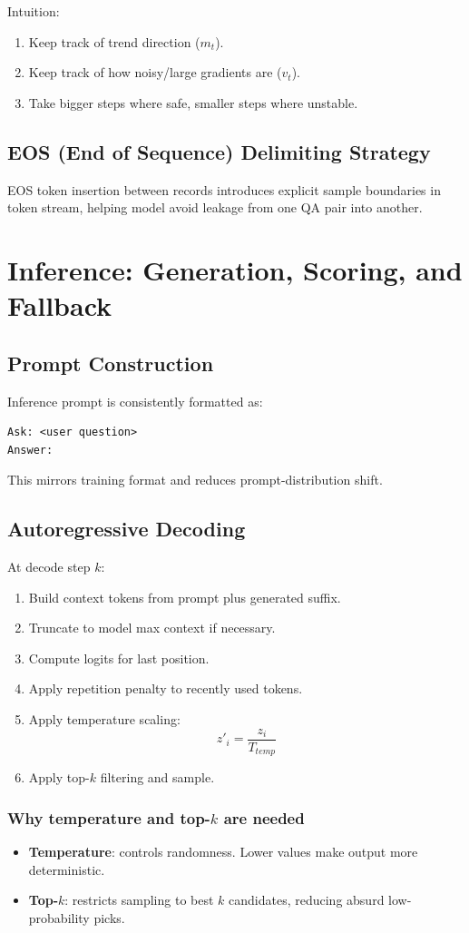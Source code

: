 \documentclass[a4paper,11pt]{article}
\begin{document}
Intuition:
\begin{enumerate}[leftmargin=1.5em]
    \item Keep track of trend direction ($m_t$).
    \item Keep track of how noisy/large gradients are ($v_t$).
    \item Take bigger steps where safe, smaller steps where unstable.
\end{enumerate}

\subsection{EOS (End of Sequence) Delimiting Strategy}
EOS token insertion between records introduces explicit sample boundaries in token stream, helping model avoid leakage from one QA pair into another.

\section{Inference: Generation, Scoring, and Fallback}
\subsection{Prompt Construction}
Inference prompt is consistently formatted as:
\begin{verbatim}
Ask: <user question>
Answer:
\end{verbatim}
This mirrors training format and reduces prompt-distribution shift.

\subsection{Autoregressive Decoding}
At decode step $k$:
\begin{enumerate}[leftmargin=1.5em]
    \item Build context tokens from prompt plus generated suffix.
    \item Truncate to model max context if necessary.
    \item Compute logits for last position.
    \item Apply repetition penalty to recently used tokens.
    \item Apply temperature scaling:
    \[
    z'_i = \frac{z_i}{T_{temp}}
    \]
    \item Apply top-$k$ filtering and sample.
\end{enumerate}

\subsubsection{Why temperature and top-$k$ are needed}
\begin{itemize}[leftmargin=1.5em]
    \item \textbf{Temperature}: controls randomness. Lower values make output more deterministic.
    \item \textbf{Top-$k$}: restricts sampling to best $k$ candidates, reducing absurd low-probability picks.
\end{itemize}
\end{document}
